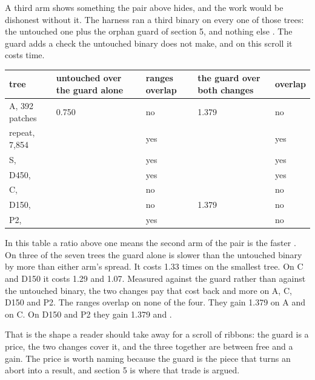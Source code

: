 A third arm shows something the pair above hides, and the work would be dishonest without it. The harness ran a third binary on every one of those trees: the untouched one plus the orphan guard of section 5, and nothing else {}. The guard adds a check the untouched binary does not make, and on this scroll it costs time.

\begin{table}[t]
\centering
\small
\begin{tabularx}{\textwidth}{XXXXX}
\toprule
tree & untouched over the guard alone & ranges overlap & the guard over both changes & overlap \\
\midrule
A, 392 patches & 0.750 & no & 1.379 & no \\
repeat, 7,854 & \RatioPlainOverGuardRepeat{} & yes & \RatioGuardOverBothRepeat{} & yes \\
S, \ZeroOneThreeNinePatchesS{} & \RatioPlainOverGuardS{} & yes & \RatioGuardOverBothS{} & yes \\
D450, \ZeroOneThreeNinePatchesDFourFifty{} & \RatioPlainOverGuardDFourFifty{} & yes & \RatioGuardOverBothDFourFifty{} & yes \\
C, \ZeroOneThreeNinePatchesC{} & \RatioPlainOverGuardC{} & no & \RatioGuardOverBothC{} & no \\
D150, \ZeroOneThreeNinePatchesDOneFifty{} & \RatioPlainOverGuardDOneFifty{} & no & 1.379 & no \\
P2, \ZeroOneThreeNinePatchesPTwo{} & \RatioPlainOverGuardPTwo{} & yes & \RatioGuardOverBothPTwo{} & no \\
\bottomrule
\end{tabularx}
\end{table}

In this table a ratio above one means the second arm of the pair is the faster {}. On three of the seven trees the guard alone is slower than the untouched binary by more than either arm's spread. It costs 1.33 times on the smallest tree. On C and D150 it costs 1.29 and 1.07. Measured against the guard rather than against the untouched binary, the two changes pay that cost back and more on A, C, D150 and P2. The ranges overlap on none of the four. They gain 1.379 on A and \RatioGuardOverBothC{} on C. On D150 and P2 they gain 1.379 and \RatioGuardOverBothPTwo{}.

That is the shape a reader should take away for a scroll of ribbons: the guard is a price, the two changes cover it, and the three together are between free and a gain. The price is worth naming because the guard is the piece that turns an abort into a result, and section 5 is where that trade is argued.

